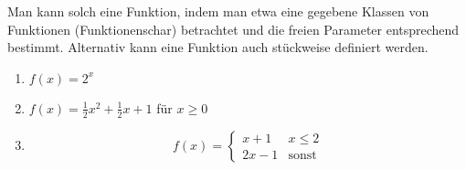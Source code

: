 \item  Man kann solch eine Funktion, indem man etwa eine gegebene Klassen von Funktionen (Funktionenschar) betrachtet und die freien Parameter entsprechend bestimmt. Alternativ kann eine Funktion auch stückweise definiert werden.
\begin{enumerate}
\item $f(x)=2^x$
\item $f(x)=\frac{1}{2}x^2+\frac{1}{2}x+1$ für $x \ge 0$
\item \[ f(x) = \begin{cases} 
      x+1 & x\leq 2 \\
      2x-1 & \text{sonst} 
   \end{cases}
\]
\end{enumerate}

